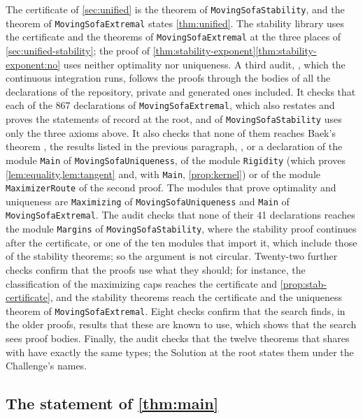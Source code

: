 The certificate of \cref{sec:unified} is the theorem
 of \texttt{MovingSofaStability}, and the theorem
 of \texttt{MovingSofaExtremal} states
\cref{thm:unified}. The stability library uses the certificate and the theorems
of \texttt{MovingSofaExtremal} at the three places of
\cref{sec:unified-stability}; the proof of
\cref{thm:stability-exponent}\ref{thm:stability-exponent:no} uses neither
optimality nor uniqueness. A third audit,
, which the continuous integration runs,
follows the proofs through the bodies of all the declarations of the repository,
private and generated ones included. It checks that each of the 867 declarations
of \texttt{MovingSofaExtremal}, which also restates and proves the statements of
record at the root, and of \texttt{MovingSofaStability} uses only the three
axioms above. It also checks
that none of them reaches Baek's theorem , the results listed
in the previous paragraph, , or a declaration of the
module \texttt{Main} of \texttt{MovingSofaUniqueness}, of the module
\texttt{Rigidity} (which proves \cref{lem:equality,lem:tangent} and, with
\texttt{Main}, \cref{prop:kernel}) or of the module \texttt{MaximizerRoute} of
the second proof. The modules that prove optimality and uniqueness are
\texttt{Maximizing} of \texttt{MovingSofaUniqueness} and \texttt{Main} of
\texttt{MovingSofaExtremal}. The audit checks that none of their 41
declarations reaches the module \texttt{Margins} of \texttt{MovingSofaStability},
where the stability proof continues after the certificate, or one of the ten
modules that import it, which include those of the stability theorems; so the
argument is not circular. Twenty-two further checks
confirm that the proofs use what they should; for instance, the classification
of the maximizing caps reaches the certificate and \cref{prop:stab-certificate},
and the stability theorems reach the certificate and the uniqueness theorem of
\texttt{MovingSofaExtremal}. Eight checks confirm that the search finds, in the
older proofs, results that these are known to use, which shows that the search
sees proof bodies. Finally, the audit checks that the twelve theorems that
 shares with  have exactly
the same types; the Solution at the root states them under the Challenge's
names.

\subsection{The statement of \texorpdfstring{\cref{thm:main}}{the main theorem}}\label{app:lean-main}

